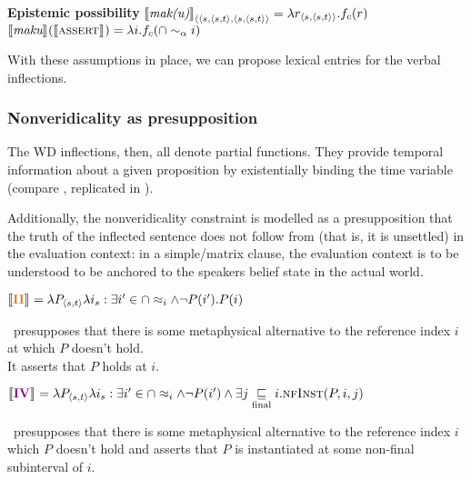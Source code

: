 \pex \textbf{Epistemic possibility}
\a$\denote[]{\textit{mak(u)}}_{\langle\langle s,\langle s,t\rangle,\langle s,\langle s,t\rangle\rangle} = \lambda r_{\langle s,\langle s,t\rangle\rangle}.f_c(r)$
\a$ \denote{\textit{maku}}(\denote{\textsc{assert}}) =\lambda i.f_c(\cap\sim_\alpha i)$




\xe


With these assumptions in place, we can propose lexical entries for the verbal inflections.


\subsubsection{Nonveridicality as presupposition}

The WD inflections, then, all denote partial functions. 
They provide temporal information about a given proposition by existentially binding the time variable (compare , replicated in \nextx).

Additionally, the nonveridicality constraint is modelled as a presupposition that the truth of the inflected sentence does not follow from (that is, it is unsettled) in the evaluation context: in a simple/matrix clause, the evaluation context is to be understood to be anchored to the speakers belief state in the actual world.




\pex\a$\denote{\textbf{\II}}=\lambda P_{\langle s,t\rangle}\lambda i_s:\exists i'\in\cap\approx_i\wedge\neg P(i').P(i)$

\II~presupposes that there is some metaphysical alternative to the reference index $ i $ at which $ P $ doesn't hold.\\It asserts that $ P $ holds at $ i $.

\a$ \denote{\IV}=\lambda P_{\langle s,t\rangle}\lambda i_s:\exists i'\in\cap\approx_i\wedge\neg P(i')\wedge\exists j\underset{\text{final}}{\sqsubseteq} i.\textsc{nfInst}(P,i,j)$

\IV~presupposes that there is some metaphysical alternative to the reference index $ i $  which $ P $ doesn't hold and asserts that $ P $ is instantiated at some non-final subinterval of $ i $.

\xe{}





